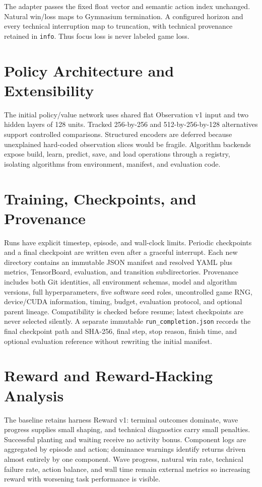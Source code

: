 \documentclass[11pt,a4paper]{article}
\begin{document}
The adapter passes the fixed float vector and semantic action index unchanged. Natural win/loss maps to Gymnasium termination. A configured horizon and every technical interruption map to truncation, with technical provenance retained in \texttt{info}. Thus focus loss is never labeled game loss.

\section{Policy Architecture and Extensibility}
The initial policy/value network uses shared flat Observation v1 input and two hidden layers of 128 units. Tracked 256-by-256 and 512-by-256-by-128 alternatives support controlled comparisons. Structured encoders are deferred because unexplained hard-coded observation slices would be fragile. Algorithm backends expose build, learn, predict, save, and load operations through a registry, isolating algorithms from environment, manifest, and evaluation code.

\section{Training, Checkpoints, and Provenance}
Runs have explicit timestep, episode, and wall-clock limits. Periodic checkpoints and a final checkpoint are written even after a graceful interrupt. Each new directory contains an immutable JSON manifest and resolved YAML plus metrics, TensorBoard, evaluation, and transition subdirectories. Provenance includes both Git identities, all environment schemas, model and algorithm versions, full hyperparameters, five software seed roles, uncontrolled game RNG, device/CUDA information, timing, budget, evaluation protocol, and optional parent lineage. Compatibility is checked before resume; latest checkpoints are never selected silently. A separate immutable \texttt{run\_completion.json} records the final checkpoint path and SHA-256, final step, stop reason, finish time, and optional evaluation reference without rewriting the initial manifest.

\section{Reward and Reward-Hacking Analysis}
The baseline retains harness Reward v1: terminal outcomes dominate, wave progress supplies small shaping, and technical diagnostics carry small penalties. Successful planting and waiting receive no activity bonus. Component logs are aggregated by episode and action; dominance warnings identify returns driven almost entirely by one component. Wave progress, natural win rate, technical failure rate, action balance, and wall time remain external metrics so increasing reward with worsening task performance is visible.
\end{document}
